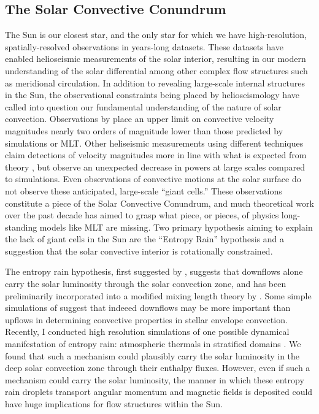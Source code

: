 \documentclass[aasms,12pt]{article}
\begin{document}
\subsection{The Solar Convective Conundrum}
The Sun is our closest star, and the only star for which we have high-resolution, spatially-resolved observations in years-long datasets.
These datasets have enabled helioseismic measurements of the solar interior, resulting in our modern understanding of the solar differential \citep{schou&all1998} among other complex flow structures such as meridional circulation.
In addition to revealing large-scale internal structures in the Sun, the observational constraints being placed by helioseismology have called into question our fundamental understanding of the nature of solar convection.
Observations by \citet{hanasoge&all2012} place an upper limit on convective velocity magnitudes nearly two orders of magnitude lower than those predicted by simulations or MLT.
Other heliseismic measurements using different techniques claim detections of velocity magnitudes more in line with what is expected from theory \citep{greer&all2015}, but observe an unexpected decrease in powers at large scales compared to simulations.
Even observations of convective motions at the solar surface \citep{hathaway&all2015} do not observe these anticipated, large-scale ``giant cells.''
These observations constitute a piece of the Solar Convective Conundrum, and much theoretical work over the past decade has aimed to grasp what piece, or pieces, of physics long-standing models like MLT are missing.
Two primary hypothesis aiming to explain the lack of giant cells in the Sun are the ``Entropy Rain'' hypothesis and a suggestion that the solar convective interior is rotationally constrained.

The entropy rain hypothesis, first suggested by \citet{spruit1997}, suggests that downflows alone carry the solar luminosity through the solar convection zone, and has been preliminarily incorporated into a modified mixing length theory by \citet{brandenburg2016}.
Some simple simulations of \citet{kapyla&all2017} suggest that indeeed downflows may be more important than upflows in determining convective properties in stellar envelope convection.
Recently, I conducted high resolution simulations of one possible dynamical manifestation of entropy rain: atmospheric thermals in stratified domains \citep{andersLB2019}.
We found that such a mechanism could plausibly carry the solar luminosity in the deep solar convection zone through their enthalpy fluxes.
However, even if such a mechanism could carry the solar luminosity, the manner in which these entropy rain droplets transport angular momentum and magnetic fields is deposited could have huge implications for flow structures within the Sun.
\end{document}

